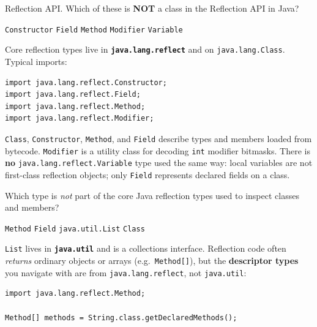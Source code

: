 \newpage


\question[4]
Reflection API. Which of these is \textbf{NOT} a class in the Reflection API in Java?
\begin{choices}
  \choice \texttt{Constructor}
  \choice \texttt{Field}
  \choice \texttt{Method}
  \choice \texttt{Modifier}
  \CorrectChoice \texttt{Variable}
\end{choices}
\begin{solution}
  Core reflection types live in \textbf{\texttt{java.lang.reflect}} and on \texttt{java.lang.Class}. Typical imports:

\begin{lstlisting}[style=javaexam]
import java.lang.reflect.Constructor;
import java.lang.reflect.Field;
import java.lang.reflect.Method;
import java.lang.reflect.Modifier;
\end{lstlisting}

  \texttt{Class}, \texttt{Constructor}, \texttt{Method}, and \texttt{Field} describe types and members loaded from bytecode. \texttt{Modifier} is a utility class for decoding \texttt{int} modifier bitmasks. There is \textbf{no} \texttt{java.lang.reflect.Variable} type used the same way: local variables are not first-class reflection objects; only \texttt{Field} represents declared fields on a class.
\end{solution}

\question[4]
Which type is \emph{not} part of the core Java reflection types used to inspect classes and members?
\begin{choices}
  \choice \texttt{Method}
  \choice \texttt{Field}
  \CorrectChoice \texttt{java.util.List}
  \choice \texttt{Class}
\end{choices}
\begin{solution}
  \texttt{List} lives in \textbf{\texttt{java.util}} and is a collections interface. Reflection code often \emph{returns} ordinary objects or arrays (e.g.\ \texttt{Method[]}), but the \textbf{descriptor types} you navigate with are from \texttt{java.lang.reflect}, not \texttt{java.util}:

\begin{lstlisting}[style=javaexam]
import java.lang.reflect.Method;

Method[] methods = String.class.getDeclaredMethods();
\end{lstlisting}
\end{solution}

